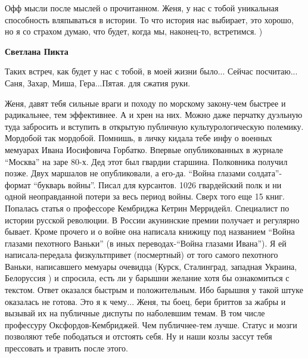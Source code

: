  
 
 
 
 
\zzSecCmt

\begin{itemize} %

Офф мысли после мыслей о прочитанном. Женя, у нас с тобой уникальная
способность вляпываться в истории. То что история нас выбирает, это хорошо, но
я со страхом думаю, что будет, когда мы, наконец-то, встретимся. )

\textbf{Светлана Пикта} 

Таких встреч, как будет у нас с тобой, в моей жизни было... Сейчас посчитаю...
Саня, Захар, Миша, Гера...Пятая. для сжатия руки.


Женя, давят тебя сильные враги и походу по морскому закону-чем быстрее и
радикальнее, тем эффективнее. А и хрен на них. Можно даже перчатку дуэльную туда
забросить и вступить в открытую публичную культурологическую полемику. Мордобой
так мордобой. Помнишь, в личку кидала тебе инфу о военных мемуарах Ивана
Иосифовича Горбатко. Впервые опубликованных в журнале \enquote{Москва} на заре 80-х. Дед
этот был гвардии старшина. Полковника получил позже. Двух маршалов не
опубликовали, а его-да. \enquote{Война глазами солдата}-формат \enquote{букварь войны}. Писал для
курсантов. 1026 гвардейский полк и ни одной неоправданной потери за весь период
войны. Сверх того еще 15 книг. Попалась статья о профессоре Кембриджа Кетрин
Мерридейл. Специалист по истории русской революции. В России акунинские премии
получает и регулярно бывает. Кроме прочего и о войне она написала книжицу под
названием \enquote{Война глазами пехотного Ваньки} (в иных переводах-\enquote{Война глазами
Ивана}). Я ей написала-передала физкультпривет (посмертный) от того самого
пехотного Ваньки, написавшего мемуары очевидца (Курск, Сталинград, западная
Украина, Белоруссия ) и спросила, есть ли у барышни желание хотя бы ознакомиться
с текстом. Ответ оказался быстрым и положительным. Ибо барышня у такой штуке
оказалась не готова. Это я к чему... Женя, ты боец, бери бриттов за жабры и
вызывай их на публичные диспуты по наболевшим темам. В том числе профессуру
Оксфордов-Кембриджей. Чем публичнее-тем лучше. Статус и мозги позволяют тебе
пободаться и отстоять себя. Ну и наши козлы зассут тебя прессовать и травить
после этого.


\end{itemize}
